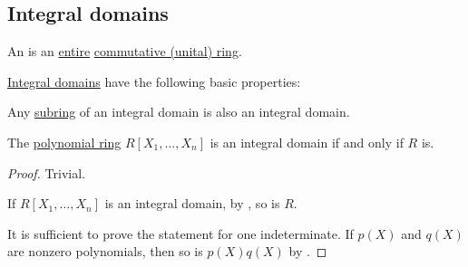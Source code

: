 \subsection{Integral domains}\label{subsec:integral_domains}

\begin{definition}\label{def:integral_domain}
  An  is an \hyperref[def:entire_semiring]{entire} \hyperref[def:ring/commutative]{commutative (unital) ring}.
\end{definition}

\begin{proposition}\label{thm:def:integral_domain/properties}
  \hyperref[def:integral_domain]{Integral domains} have the following basic properties:
  \begin{thmenum}
     Any \hyperref[def:ring/submodel]{subring} of an integral domain is also an integral domain.

     The \hyperref[def:polynomial_semiring]{polynomial ring} \( R[X_1, \ldots, X_n] \) is an integral domain if and only if \( R \) is.
  \end{thmenum}
\end{proposition}
\begin{proof}
   Trivial.


  \SufficiencySubProof* If \( R[X_1, \ldots, X_n] \) is an integral domain, by , so is \( R \).

  \NecessitySubProof* It is sufficient to prove the statement for one indeterminate. If \( p(X) \) and \( q(X) \) are nonzero polynomials, then so is \( p(X) q(X) \) by .
\end{proof}

